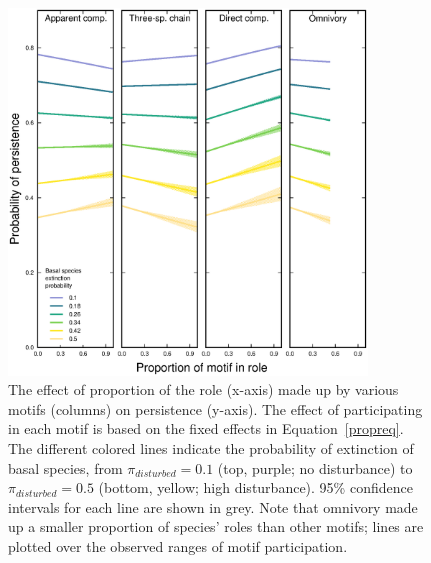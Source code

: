 \documentclass[12pt]{article}
\begin{document}
\begin{spacing}{2.0}
    
        \begin{figure}[hb!]
        \centering
        \includegraphics[width=0.85\textwidth]{figures/persistence_motif_participation.eps}
        \caption{The effect of proportion of the role (x-axis) made up by various motifs (columns) on persistence (y-axis). The effect of participating in each motif is based on the fixed effects in Equation~\ref{propreq}. The different colored lines indicate the probability of extinction of basal species, from $\pi_{disturbed} = 0.1$ (top, purple; no disturbance) to $\pi_{disturbed} = 0.5$ (bottom, yellow; high disturbance). 95\% confidence intervals for each line are shown in grey. Note that omnivory made up a smaller proportion of species' roles than other motifs; lines are plotted over the observed ranges of motif participation.}
    \label{fig:prop_lmer_all}
    \end{figure}
        


\end{spacing}
\end{document}
